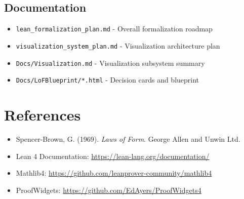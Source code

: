\documentclass{amsart}
\theoremstyle{definition}
\theoremstyle{remark}
\begin{document}
\subsection{Documentation}
\begin{itemize}
\item \texttt{lean\_formalization\_plan.md} - Overall formalization roadmap
\item \texttt{visualization\_system\_plan.md} - Visualization architecture plan
\item \texttt{Docs/Visualization.md} - Visualization subsystem summary
\item \texttt{Docs/LoFBlueprint/*.html} - Decision cards and blueprint
\end{itemize}

\section{References}

\begin{itemize}
\item Spencer-Brown, G. (1969). \emph{Laws of Form}. George Allen and Unwin Ltd.
\item Lean 4 Documentation: \url{https://lean-lang.org/documentation/}
\item Mathlib4: \url{https://github.com/leanprover-community/mathlib4}
\item ProofWidgets: \url{https://github.com/EdAyers/ProofWidgets4}
\end{itemize}
\end{document}
